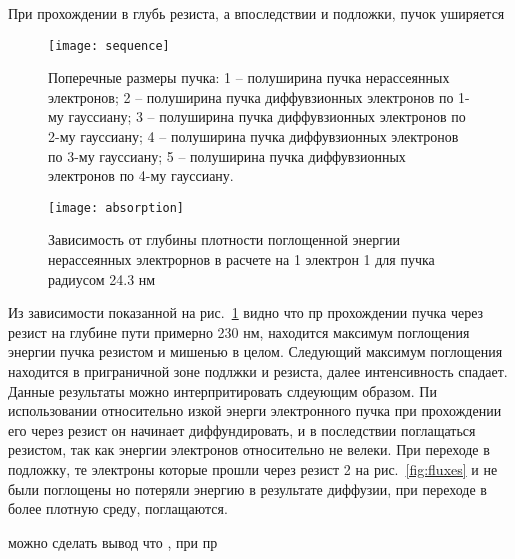 При прохождении в глубь резиста, а впоследствии и подложки, пучок уширяется
\begin{figure}[h]
    \center
    \texttt{[image: sequence]}
    \caption{Поперечные размеры пучка:
1 -- полуширина пучка нерассеянных электронов;
2 -- полуширина пучка диффувзионных электронов по 1-му гауссиану;
3 -- полуширина пучка диффувзионных электронов по 2-му гауссиану;
4 -- полуширина пучка диффувзионных электронов по 3-му гауссиану;
5 -- полуширина пучка диффувзионных электронов по 4-му гауссиану.}
    \label{fig:sequence}
\end{figure}


\begin{figure}[h]
    \center
    \texttt{[image: absorption]}
    \caption{Зависимость от глубины плотности поглощенной энергии нерассеянных электрорнов в расчете на 1 электрон 1 для пучка радиусом 24.3 нм}
    \label{fig:absorption}
\end{figure}

Из зависимости показанной на рис.~\ref{fig:sequence} видно что пр прохождении пучка через резист на глубине пути примерно 230 нм, находится максимум поглощения энергии пучка резистом и мишенью в целом. Следующий максимум поглощения находится в приграничной зоне подлжки и резиста, далее интенсивность спадает. Данные результаты можно интерпритировать слдеующим образом. Пи использовании относительно изкой энерги электронного пучка при прохождении его через резист он начинает диффундировать, и в последствии поглащаться резистом, так как энергии электронов относительно не велеки. При переходе в подложку, те электроны которые прошли через резист 2 на рис.~\ref{fig:fluxes} и не были поглощены но потеряли энергию в результате диффузии, при переходе в более плотную среду, поглащаются.






можно сделать вывод что , при пр



